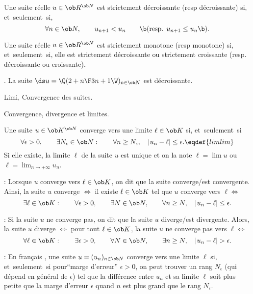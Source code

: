 \Definition []  Une suite r\'eelle $u\in\ob R^{\ob N}$ est strictement d\'ecroissante (resp d\'ecroissante) si, et~seulement~si,
$$
\forall n\in\ob N, \qquad {u_{n+1}< u_n}\qquad\b(\mbox{resp. }{u_{n+1}\le u_n}\b).
$$

\Definition []  Une suite r\'eelle $u\in\ob R^{\ob N}$ est strictement monotone (resp monotone) si, et~seulement~si,
elle est strictement d\'ecroissante ou strictement croissante (resp. d\'ecroissante ou croissante). 
\bigskip

{}
\bigskip

\Exemple. La suite $\ds u=\Q({2+n\F 3n+1}\W)_{n\in\ob N}$ est d\'ecroissante. 
\bigskip

\Section Limi, Convergence des suites. 

\Subsection Convergence, divergence et limites. 

\Definition []  Une suite $u\in\ob K^{\ob N}$ converge vers une limite $\ell\in\ob K$ si, et~seulement~si
$$
\forall\epsilon>0, \qquad \exists N_\epsilon\in\ob N:\qquad \forall n\ge N_\epsilon, \quad |u_n-\ell|\le \epsilon.\eqdef{limlim}
$$
Si elle existe, la limite $\ell$ de la suite $u$ est unique et on la note $\ell=\lim u$ ou $\ell=\lim_{n\to+\infty}u_n$. 
\bigskip

\Remarque : Lorsque $u$ converge vers $\ell\in\ob K$, on dit que la suite converge/est convergente. 
Ainsi, la suite $u$ converge $\Leftrightarrow$ il existe $\ell\in\ob K$ tel que $u$ converge vers $\ell\Leftrightarrow$
$$
\exists \ell\in\ob K:\qquad \forall\epsilon>0, \qquad \exists N\in\ob N,\qquad \forall n\ge N, \quad |u_n-\ell|\le \epsilon.
$$

\Remarque : Si la suite $u$ ne converge pas, on dit que la suite $u$ diverge/est divergente. 
Alors, la suite $u$ diverge $\Leftrightarrow$ pour tout $\ell\in\ob K$, la suite $u$ ne converge pas vers $\ell\Leftrightarrow$
$$
\forall \ell\in\ob K: \qquad\exists\epsilon>0, \qquad \forall N\in\ob N,\qquad \exists n\ge N, \quad |u_n-\ell|> \epsilon.
$$

\Remarque : En fran\c cais , une suite $u=(u_n)_{n\in\ob N}$ converge vers une limite $\ell$ si, et~seulement~si pour``marge d'erreur'' $\epsilon> 0$, on peut trouver un rang $N_\epsilon$ (qui d\'epend en g\'en\'eral de $\epsilon$) tel que la diff\'erence entre $u_n$ et sa limite $\ell$ soit plus petite que la marge d'erreur $\epsilon$ quand $n$ est plus grand que le rang $N_\epsilon$. 
\bigskip

